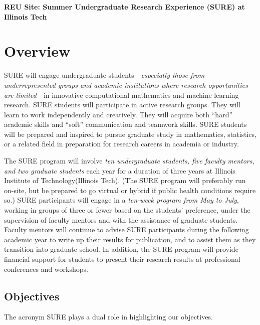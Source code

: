 \documentclass[11pt]{NSFamsart}
\begin{document}


\begin{center}
\Large 
\textbf{REU Site: Summer Undergraduate Research Experience (SURE) at Illinois Tech}

\end{center}
\vspace{-2ex}


\section{Overview} 

SURE will engage undergraduate students---\emph{especially those from underrepresented groups and academic institutions where research opportunities are limited}---in innovative computational mathematics and machine learning research.  SURE students will participate in active research groups.  They will learn to work independently and creatively. They will acquire both ``hard'' academic skills and ``soft'' communication and teamwork skills.  SURE students will be prepared and inspired to pursue graduate study in mathematics, statistics, or a related field in preparation for research careers in academia or industry.

The SURE program will involve \emph{ten undergraduate students, five faculty mentors, and two graduate students} each year for a duration of three years at Illinois Institute of Technology(Illinois Tech). (The SURE program will preferably run on-site, but be prepared to go virtual or hybrid if public health conditions require so.) SURE participants will engage in a \emph{ten-week program from May to July}, working in groups of three or fewer based on the students’ preference, under the supervision of faculty mentors and with the assistance of graduate students. Faculty mentors will continue to advise SURE participants during the following academic year to write up their results for publication, and to assist them as they transition into graduate school. In addition, the SURE program will provide financial support for students to present their research results at professional conferences and workshops.

\subsection{Objectives} The acronym SURE plays a dual role in highlighting our objectives.
\end{document}
